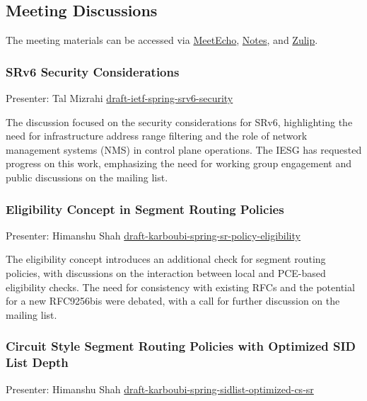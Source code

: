 \documentclass{article}
\begin{document}
\subsection{Meeting Discussions}

The meeting materials can be accessed via \href{https://meetings.conf.meetecho.com/ietf122/?session=33982}{MeetEcho}, \href{https://notes.ietf.org/notes-ietf-122-spring}{Notes}, and \href{https://zulip.ietf.org/#narrow/stream/spring}{Zulip}.

\subsubsection{SRv6 Security Considerations}

Presenter: Tal Mizrahi  
\href{https://datatracker.ietf.org/doc/draft-ietf-spring-srv6-security/}{draft-ietf-spring-srv6-security}

The discussion focused on the security considerations for SRv6, highlighting the need for infrastructure address range filtering and the role of network management systems (NMS) in control plane operations. The IESG has requested progress on this work, emphasizing the need for working group engagement and public discussions on the mailing list.

\subsubsection{Eligibility Concept in Segment Routing Policies}

Presenter: Himanshu Shah  
\href{https://datatracker.ietf.org/doc/draft-karboubi-spring-sr-policy-eligibility/}{draft-karboubi-spring-sr-policy-eligibility}

The eligibility concept introduces an additional check for segment routing policies, with discussions on the interaction between local and PCE-based eligibility checks. The need for consistency with existing RFCs and the potential for a new RFC9256bis were debated, with a call for further discussion on the mailing list.

\subsubsection{Circuit Style Segment Routing Policies with Optimized SID List Depth}

Presenter: Himanshu Shah  
\href{https://datatracker.ietf.org/doc/draft-karboubi-spring-sidlist-optimized-cs-sr/}{draft-karboubi-spring-sidlist-optimized-cs-sr}
\end{document}
